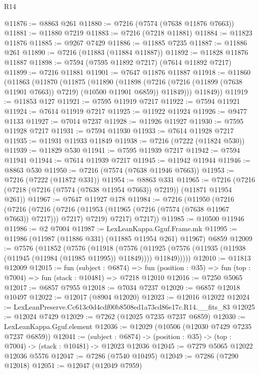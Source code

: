 \begin{lexlean}{R14}
\begin{coremodule}
@11876 := @8863 @261
@11880 := @7216 (@7574 (@7638 @11876 @7663))
@11881 := @11880 @7219
@11883 := @7216 (@7218 @11881)
@11884 := @11823 @11876
@11885 := @9267 @7429
@11886 := @11885 @7235
@11887 := @11886 @261
@11890 := @7216 (@11883 (@11884 @11887))
@11892 := @11828 @11876 @11887
@11898 := @7594 (@7595 @11892 @7217) (@7614 @11892 @7217)
@11899 := @7216 @11881
@11901 := @7647 @11876 @11887
@11918 := @11860
    (@11863
      (@11870
        (@11875
          (@11890
            (@11898
              (@7216 (@7216 (@11899 (@7638 @11901 @7663)) @7219) (@10500 @11901 @6859))
              @11849)))
        @11849))
@11919 := @11853 @127
@11921 := @7595 @11919 @7217
@11922 := @7594 @11921
@11924 := @7614 @11919 @7217
@11925 := @11922 @11924
@11926 := @9477 @1133
@11927 := @7014 @7237
@11928 := @11926 @11927
@11930 := @7595 @11928 @7217
@11931 := @7594 @11930
@11933 := @7614 @11928 @7217
@11935 := @11931 @11933 @11849
@11938 := @7216 (@7222 (@11824 @530))
@11939 := @11829 @530
@11941 := @7595 @11939 @7217
@11942 := @7594 @11941
@11944 := @7614 @11939 @7217
@11945 := @11942 @11944
@11946 := @8863 @530
@11950 := @7216 (@7574 (@7638 @11946 @7663))
@11953 := @7216 (@7222 (@11872 @331))
@11954 := @8863 @331
@11965 := @7216 (@7216 (@7218 (@7216 (@7574 (@7638 @11954 @7663)) @7219)) (@11871 @11954 @261))
@11967 := @7647 @11927 @178
@11984 := @7216
    (@11950
      (@7216
        (@7216
          (@7216 (@7216 (@11953 (@11965 (@7216 (@7574 (@7638 @11967 @7663)) @7217))) @7217) @7219)
          @7217)
        @7217))
@11985 := @10500 @11946
@11986 := @2 @7004
@11987 := LexLeanKappa.Gguf.Frame.mk
@11995 := @11986 (@11987 (@11886 @331) (@11885 @11954 @261) @11967) @6859
@12009 := @7576
    (@11852
      (@7576
        (@11918
          (@7576
            (@11925 (@7576 (@11935 (@11938 (@11945 (@11984 (@11985 @11995)) @11849)))) @11849)))))
@12010 := @11813 @12009
@12015 := fun (subject : @6874) =>
  fun (position : @35) => fun (top : @7004) => fun (stack : @10481) => @7218 @12010
@12016 := @7250 @5065
@12017 := @6857 @7955
@12018 := @7034 @7237
@12020 := @6857 @12018 @10497
@12022 := @12017 (@8904 @12020)
@12023 := @12016 @12022
@12024 := LexLeanPreserve.Cc613c0d4cdf00b8508ed1a73cd86e17c.R14.__fits_83
@12025 := @12024 @7429
@12029 := @7262 (@12025 @7235 @7237 @6859)
@12030 := LexLeanKappa.Gguf.element
@12036 := @12029 (@10506 (@12030 @7429 @7235 @7237 @6859))
@12041 := (subject : @6874) ->
  (position : @35) -> (top : @7004) -> (stack : @10481) -> @12023 @12036
@12045 := @7279 @5065 @12022 @12036 @5576
@12047 := @7286 (@7540 @10495)
@12049 := @7286 (@7290 @12018)
@12051 := @12047 (@12049 @7959)

\end{coremodule}
\end{lexlean}
